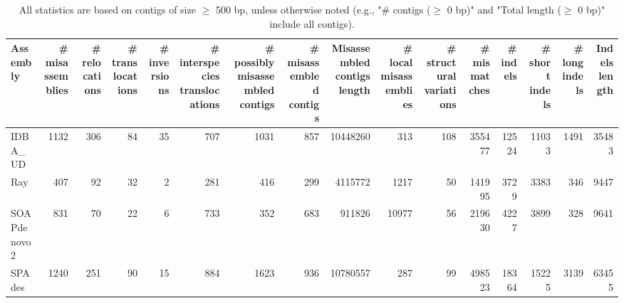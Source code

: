 \documentclass[12pt,a4paper]{article}
\begin{document}
\begin{table}[ht]
\begin{center}
\caption{All statistics are based on contigs of size $\geq$ 500 bp, unless otherwise noted (e.g., "\# contigs ($\geq$ 0 bp)" and "Total length ($\geq$ 0 bp)" include all contigs).}
\begin{tabular}{|l*{15}{|r}|}
\hline
Assembly & \# misassemblies &     \# relocations &     \# translocations &     \# inversions &     \# interspecies translocations & \# possibly misassembled contigs & \# misassembled contigs & Misassembled contigs length & \# local misassemblies & \# structural variations & \# mismatches & \# indels &     \# short indels &     \# long indels & Indels length \\ \hline
IDBA\_UD & 1132 & 306 & 84 & 35 & 707 & 1031 & 857 & 10448260 & 313 & 108 & 355477 & 12524 & 11033 & 1491 & 35483 \\ \hline
Ray & 407 & 92 & 32 & 2 & 281 & 416 & 299 & 4115772 & 1217 & 50 & 141995 & 3729 & 3383 & 346 & 9447 \\ \hline
SOAPdenovo2 & 831 & 70 & 22 & 6 & 733 & 352 & 683 & 911826 & 10977 & 56 & 219630 & 4227 & 3899 & 328 & 9641 \\ \hline
SPAdes & 1240 & 251 & 90 & 15 & 884 & 1623 & 936 & 10780557 & 287 & 99 & 498523 & 18364 & 15225 & 3139 & 63455 \\ \hline
\end{tabular}
\end{center}
\end{table}
\end{document}
